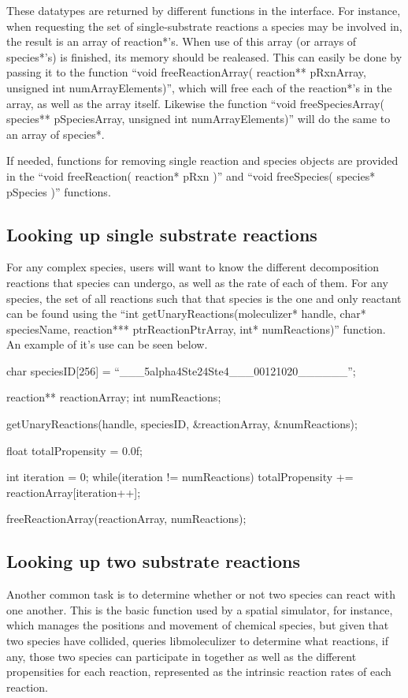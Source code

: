 These datatypes are returned by different functions in the interface.
For instance, when requesting the set of single-substrate reactions a
species may be involved in, the result is an array of reaction*'s.
When use of this array (or arrays of species*'s) is finished, its
memory should be realeased.  This can easily be done by passing it to
the function ``void freeReactionArray( reaction** pRxnArray, unsigned
int numArrayElements)'', which will free each of the reaction*'s in the
array, as well as the array itself.  Likewise the function ``void
freeSpeciesArray( species** pSpeciesArray, unsigned int
numArrayElements)'' will do the same to an array of species*.

If needed, functions for removing single reaction and species objects
are provided in the ``void freeReaction( reaction* pRxn )'' and ``void
freeSpecies( species* pSpecies )'' functions.

\subsection{Looking up single substrate reactions}
For any complex species, users will want to know the different
decomposition reactions that species can undergo, as well as the rate
of each of them.  For any species, the set of all reactions such that
that species is the one and only reactant can be found using the ``int
getUnaryReactions(moleculizer* handle, char* speciesName, reaction***
ptrReactionPtrArray, int* numReactions)'' function.  An example of
it's use can be seen below.

\begin{ExampleC}
  char speciesID[256] = ``___5alpha4Ste24Ste4___00121020______'';
  
  reaction** reactionArray;
  int numReactions;

  getUnaryReactions(handle, speciesID, &reactionArray, &numReactions);

  float totalPropensity = 0.0f;

  int iteration = 0;
  while(iteration != numReactions)
  {
    totalPropensity += reactionArray[iteration++];
  }

  freeReactionArray(reactionArray, numReactions);

\end{ExampleC}

\subsection{Looking up two substrate reactions}
Another common task is to determine whether or not two species can
react with one another.  This is the basic function used by a spatial
simulator, for instance, which manages the positions and movement of
chemical species, but given that two species have collided, queries
libmoleculizer to determine what reactions, if any, those two species
can participate in together as well as the different propensities for
each reaction, represented as the intrinsic reaction rates of each
reaction.  

